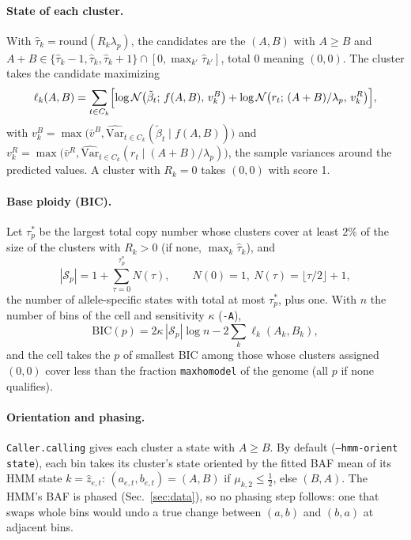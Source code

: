 \documentclass[11pt]{article}
\newcommand{\code}[1]{\texttt{#1}}
\newcommand{\Norm}{\mathcal{N}}
\begin{document}
\paragraph{State of each cluster.}
With $\hat\tau_k = \mathrm{round}(R_k \lambda_p)$, the candidates are the $(A,B)$ with $A \ge B$
and $A + B \in \{\hat\tau_k - 1, \hat\tau_k, \hat\tau_k + 1\} \cap [0, \max_{k'}\hat\tau_{k'}]$,
total 0 meaning $(0,0)$. The cluster takes the candidate maximizing
\begin{equation}
\ell_k(A,B) = \sum_{t \in C_k} \Bigl[\log\Norm\bigl(\tilde\beta_t;\, f(A,B),\, v^B_k\bigr)
  + \log\Norm\bigl(r_t;\, (A+B)/\lambda_p,\, v^R_k\bigr)\Bigr],
\end{equation}
with $v^B_k = \max\bigl(\bar v^B, \widehat{\mathrm{Var}}_{t \in C_k}(\tilde\beta_t \mid f(A,B))\bigr)$
and $v^R_k = \max\bigl(\bar v^R, \widehat{\mathrm{Var}}_{t \in C_k}(r_t \mid (A+B)/\lambda_p)\bigr)$,
the sample variances around the predicted values. A cluster with $R_k = 0$ takes $(0,0)$ with
score 1.

\paragraph{Base ploidy (BIC).}
Let $\tau^*_p$ be the largest total copy number whose clusters cover at least $2\%$ of the size
of the clusters with $R_k > 0$ (if none, $\max_k \hat\tau_k$), and
\begin{equation}
|\mathcal{S}_p| = 1 + \sum_{\tau=0}^{\tau^*_p} N(\tau), \qquad N(0) = 1,\ N(\tau) = \lfloor \tau/2 \rfloor + 1,
\end{equation}
the number of allele-specific states with total at most $\tau^*_p$, plus one. With $n$ the number
of bins of the cell and sensitivity $\kappa$ (\code{-A}),
\begin{equation}
\mathrm{BIC}(p) = 2\kappa\, |\mathcal{S}_p| \log n - 2 \sum_k \ell_k(A_k, B_k),
\label{eq:bic}
\end{equation}
and the cell takes the $p$ of smallest BIC among those whose clusters assigned $(0,0)$ cover less
than the fraction \code{maxhomodel} of the genome (all $p$ if none qualifies).

\paragraph{Orientation and phasing.}
\code{Caller.calling} gives each cluster a state with $A \ge B$. By default
(\code{--hmm-orient state}), each bin takes its cluster's state oriented by the fitted BAF mean of
its HMM state $k = \hat z_{e,t}$: $(a_{e,t}, b_{e,t}) = (A, B)$ if $\mu_{k,2} \le \tfrac12$, else
$(B, A)$. The HMM's BAF is phased (Sec.~\ref{sec:data}), so no phasing step follows: one that
swaps whole bins would undo a true change between $(a, b)$ and $(b, a)$ at adjacent bins.
\end{document}
